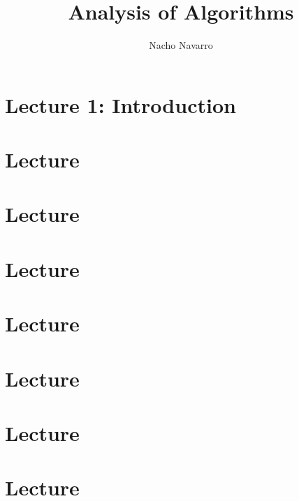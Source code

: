 \documentclass{easyclass}
\begin{document}
\begin{titlepage}
    \title{Analysis of Algorithms}
    \author{Nacho Navarro}
    \maketitle
\end{titlepage}

\tableofcontents

\chapter{Lecture 1: Introduction}


\chapter{Lecture}


\chapter{Lecture}


\chapter{Lecture}


\chapter{Lecture}


\chapter{Lecture}


\chapter{Lecture}


\chapter{Lecture}

\end{document}
